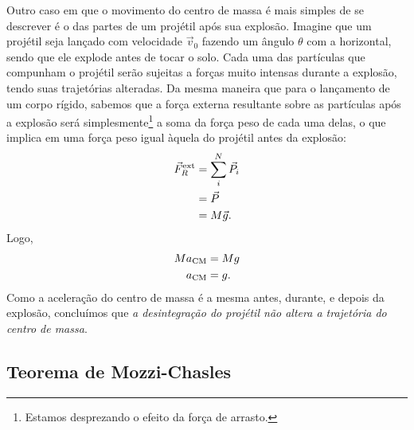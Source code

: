 Outro caso em que o movimento do centro de massa é mais simples de se descrever é o das partes de um projétil após sua explosão. Imagine que um projétil seja lançado com velocidade $\vec{v}_0$ fazendo um ângulo $\theta$ com a horizontal, sendo que ele explode antes de tocar o solo. Cada uma das partículas que compunham o projétil serão sujeitas a forças muito intensas durante a explosão, tendo suas trajetórias alteradas. Da mesma maneira que para o lançamento de um corpo rígido, sabemos que a força externa resultante sobre as partículas após a explosão será simplesmente\footnote{Estamos desprezando o efeito da força de arrasto.} a soma da força peso de cada uma delas, o que implica em uma força peso igual àquela do projétil antes da explosão:
\begin{align}
	\vec{F}_{R}^{\rm{ext}} &= \sum_i^N \vec{P}_i \\
		&= \vec{P} \\
		&= M\vec{g}.
\end{align}
%
Logo,
\begin{align}
    M a_{\rm{CM}} &= M g \\
    a_{\rm{CM}} &= g.
\end{align}
%
Como a aceleração do centro de massa é a mesma antes, durante, e depois da explosão, concluímos que \emph{a desintegração do projétil não altera a trajetória do centro de massa}.

\subsection{Teorema de Mozzi-Chasles}


